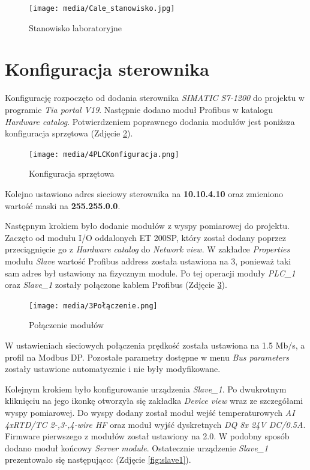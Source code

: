 \documentclass{article}
\begin{document}
\begin{figure}[H]
    \centering
    \texttt{[image: media/Cale\_stanowisko.jpg]}
    \caption{Stanowisko laboratoryjne}
    \label{fig:stanowisko}
\end{figure}
\newpage
\section{Konfiguracja sterownika}

Konfigurację rozpoczęto od dodania sterownika \textit{SIMATIC S7-1200} do projektu w programie \textit{Tia portal V19}. Następnie dodano moduł Profibus w katalogu \textit{Hardware catalog}. Potwierdzeniem poprawnego dodania modułów jest poniższa konfiguracja sprzętowa (Zdjęcie \ref{fig:konfiguracja}).

\begin{figure}[H]
    \centering
    \texttt{[image: media/4PLCKonfiguracja.png]}
    \caption{Konfiguracja sprzętowa}
    \label{fig:konfiguracja}
\end{figure}

Kolejno ustawiono adres sieciowy sterownika na \textbf{10.10.4.10} oraz zmieniono wartość maski na \textbf{255.255.0.0}.

Następnym krokiem było dodanie modułów z wyspy pomiarowej do projektu. Zaczęto od modułu I/O oddalonych ET 200SP, który został dodany poprzez przeciągnięcie go z \textit{Hardware catalog} do \textit{Network view}. W zakładce \textit{Properties} modułu \textit{Slave} wartość Profibus address została ustawiona na 3, ponieważ taki sam adres był ustawiony na fizycznym module. Po tej operacji moduły \textit{PLC\_1} oraz \textit{Slave\_1} zostały połączone kablem Profibus (Zdjęcie \ref{fig:polaczenie}). 

\begin{figure}[H]
    \centering
    \texttt{[image: media/3Połączenie.png]}
    \caption{Połączenie modułów}
    \label{fig:polaczenie}
\end{figure}

W ustawieniach sieciowych połączenia prędkość została ustawiona na 1.5 Mb/s, a profil na Modbus DP. Pozostałe parametry dostępne w menu \textit{Bus parameters} zostały ustawione automatycznie i nie były modyfikowane.

Kolejnym krokiem było konfigurowanie urządzenia \textit{Slave\_1}. Po dwukrotnym kliknięciu na jego ikonkę otworzyła się zakładka \textit{Device view} wraz ze szczegółami wyspy pomiarowej. Do wyspy dodany został moduł wejść temperaturowych \textit{AI 4xRTD/TC 2-,3-,4-wire HF} oraz moduł wyjść dyskretnych \textit{DQ 8x 24V DC/0.5A}. Firmware pierwszego z modułów został ustawiony na 2.0. W podobny sposób dodano moduł końcowy \textit{Server module}. Ostatecznie urządzenie \textit{Slave\_1} prezentowało się następująco: (Zdjęcie \ref{fig:slave1}).
\end{document}
